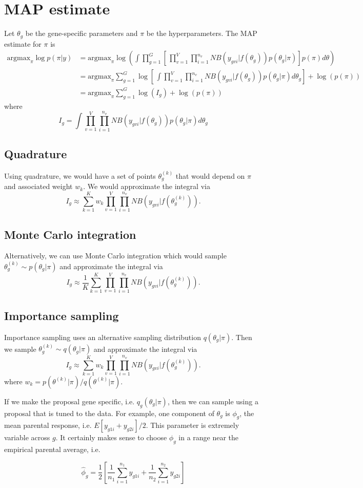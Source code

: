 \documentclass{article}
\newcommand{\argmax}{\mbox{argmax}}
\begin{document}
\section{MAP estimate}

Let $\theta_g$ be the gene-specific parameters and $\pi$ be the hyperparameters. The MAP estimate for $\pi$ is 
\begin{align*}
\argmax_{\pi} \log p(\pi|y) 
&= \argmax_{\pi} \log\left( \int \prod_{g=1}^G \left[ \, \prod_{v=1}^V \prod_{i=1}^{n_v} NB(y_{gvi}|f(\theta_g)) p(\theta_g|\pi) \right] p(\pi) d\theta \right) \\
&= \argmax_{\pi}\sum_{g=1}^G \log \left[ \, \int \prod_{v=1}^V \prod_{i=1}^{n_v} NB(y_{gvi}| f(\theta_g)) p(\theta_g|\pi) d\theta_g  \right] + \log(p(\pi)) \\
&= \argmax_{\pi}\sum_{g=1}^G \log(I_g) + \log(p(\pi)) 
\end{align*}
where 
 \[
 I_g = \int \prod_{v=1}^V \prod_{i=1}^{n_v} NB(y_{gvi}| f(\theta_g)) p(\theta_g|\pi) d\theta_g
 \]

\subsection{Quadrature}

Using quadrature, we would have a set of points $\theta_g^{(k)}$ that would depend on $\pi$ and associated weight $w_k$. We would approximate the integral via 
\[
I_g \approx \sum_{k=1}^K w_k \prod_{v=1}^V \prod_{i=1}^{n_v}  NB(y_{gvi}| f(\theta_g^{(k)})).
\]

\subsection{Monte Carlo integration}

Alternatively, we can use Monte Carlo integration which would sample $\theta_g^{(k)} \sim p(\theta_g|\pi)$ and approximate the integral via 
\[
I_g \approx \frac{1}{K} \sum_{k=1}^K \prod_{v=1}^V \prod_{i=1}^{n_v}  NB(y_{gvi}| f(\theta_g^{(k)})).
\]


\subsection{Importance sampling}

Importance sampling uses an alternative sampling distribution $q(\theta_g|\pi)$. Then we sample $\theta_g^{(k)} \sim q(\theta_g|\pi)$ and approximate the integral via 
\[
I_g \approx \sum_{k=1}^K w_k \prod_{v=1}^V \prod_{i=1}^{n_v} NB(y_{gvi}| f(\theta_g^{(k)})).
\]
where $w_k = p(\theta^{(k)}|\pi)/q(\theta^{(k)}|\pi)$. 

If we make the proposal gene specific, i.e. $q_g(\theta_g|\pi)$, then we can sample using a proposal that is tuned to the data. For example, one component of $\theta_g$ is $\phi_g$, the mean parental response, i.e. $E[y_{g1i}+y_{g2i}]/2$. This parameter is extremely variable across $g$. It certainly makes sense to choose $\phi_g$ in a range near the empirical parental average, i.e. 

\[ \hat{\phi}_g = \frac{1}{2}\left[ \frac{1}{n_1} \sum_{i=1}^{n_1} y_{g1i} + \frac{1}{n_2} \sum_{i=1}^{n_2} y_{g2i} \right] \]
\end{document}
